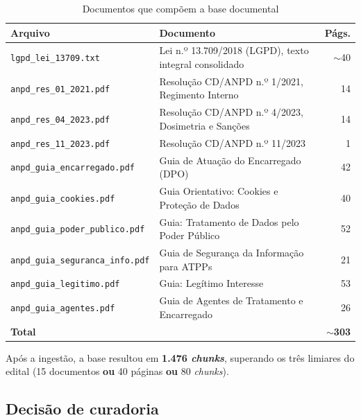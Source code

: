 \documentclass[
  12pt,
  a4paper,
  brazil,
  article,
  oneside,
  sumario=tradicional
]{abntex2}
\begin{document}
\begin{table}[H]
\caption{Documentos que compõem a base documental}
\label{tab:base}
\centering\small
\begin{tabularx}{\textwidth}{p{5.5cm}Xr}
\toprule
\textbf{Arquivo} & \textbf{Documento} & \textbf{Págs.} \\
\midrule
\texttt{lgpd\_lei\_13709.txt}            & Lei n.º 13.709/2018 (LGPD), texto integral consolidado   & $\sim$40 \\
\texttt{anpd\_res\_01\_2021.pdf}         & Resolução CD/ANPD n.º 1/2021, Regimento Interno          & 14 \\
\texttt{anpd\_res\_04\_2023.pdf}         & Resolução CD/ANPD n.º 4/2023, Dosimetria e Sanções       & 14 \\
\texttt{anpd\_res\_11\_2023.pdf}         & Resolução CD/ANPD n.º 11/2023                             &  1 \\
\texttt{anpd\_guia\_encarregado.pdf}     & Guia de Atuação do Encarregado (DPO)                      & 42 \\
\texttt{anpd\_guia\_cookies.pdf}         & Guia Orientativo: Cookies e Proteção de Dados             & 40 \\
\texttt{anpd\_guia\_poder\_publico.pdf}  & Guia: Tratamento de Dados pelo Poder Público              & 52 \\
\texttt{anpd\_guia\_seguranca\_info.pdf} & Guia de Segurança da Informação para ATPPs                & 21 \\
\texttt{anpd\_guia\_legitimo.pdf}        & Guia: Legítimo Interesse                                  & 53 \\
\texttt{anpd\_guia\_agentes.pdf}         & Guia de Agentes de Tratamento e Encarregado               & 26 \\
\midrule
\multicolumn{2}{l}{\textbf{Total}} & \textbf{$\sim$303} \\
\bottomrule
\end{tabularx}
\end{table}

Após a ingestão, a base resultou em \textbf{1.476 \textit{chunks}}, superando os
três limiares do edital (15 documentos \textbf{ou} 40 páginas \textbf{ou} 80
\textit{chunks}).

\subsection{Decisão de curadoria}
\end{document}
